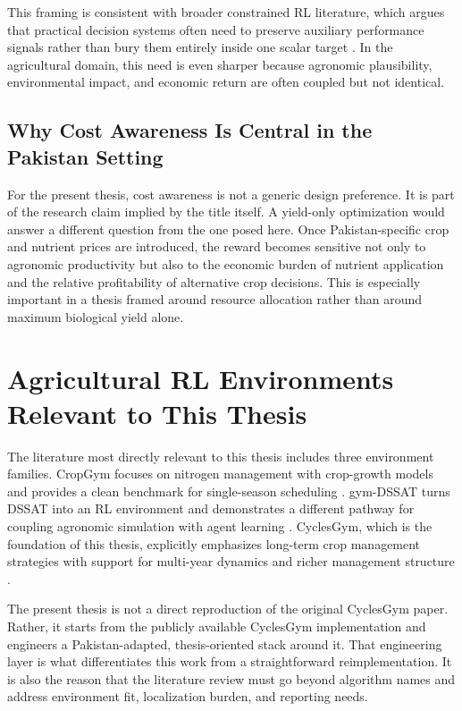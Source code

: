 This framing is consistent with broader constrained RL literature, which argues that practical decision systems often need to preserve auxiliary performance signals rather than bury them entirely inside one scalar target \citep{huang2022cmorl,zhao2023safesurvey}. In the agricultural domain, this need is even sharper because agronomic plausibility, environmental impact, and economic return are often coupled but not identical.

\subsection{Why Cost Awareness Is Central in the Pakistan Setting}

For the present thesis, cost awareness is not a generic design preference. It is part of the research claim implied by the title itself. A yield-only optimization would answer a different question from the one posed here. Once Pakistan-specific crop and nutrient prices are introduced, the reward becomes sensitive not only to agronomic productivity but also to the economic burden of nutrient application and the relative profitability of alternative crop decisions. This is especially important in a thesis framed around resource allocation rather than around maximum biological yield alone.

\section{Agricultural RL Environments Relevant to This Thesis}

The literature most directly relevant to this thesis includes three environment families. CropGym focuses on nitrogen management with crop-growth models and provides a clean benchmark for single-season scheduling \citep{kallenberg2023cropgym}. gym-DSSAT turns DSSAT into an RL environment and demonstrates a different pathway for coupling agronomic simulation with agent learning \citep{gautron2022gymdssat}. CyclesGym, which is the foundation of this thesis, explicitly emphasizes long-term crop management strategies with support for multi-year dynamics and richer management structure \citep{turchetta2022cyclesgym}.

The present thesis is not a direct reproduction of the original CyclesGym paper. Rather, it starts from the publicly available CyclesGym implementation and engineers a Pakistan-adapted, thesis-oriented stack around it. That engineering layer is what differentiates this work from a straightforward reimplementation. It is also the reason that the literature review must go beyond algorithm names and address environment fit, localization burden, and reporting needs.

